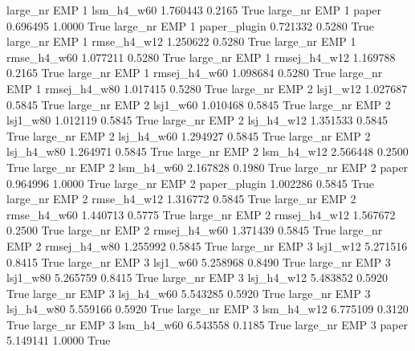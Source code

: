   large_nr      EMP                 1   lsm_h4_w60    1.760443      0.2165    True
  large_nr      EMP                 1        paper    0.696495      1.0000    True
  large_nr      EMP                 1 paper_plugin    0.721332      0.5280    True
  large_nr      EMP                 1  rmse_h4_w12    1.250622      0.5280    True
  large_nr      EMP                 1  rmse_h4_w60    1.077211      0.5280    True
  large_nr      EMP                 1 rmsej_h4_w12    1.169788      0.2165    True
  large_nr      EMP                 1 rmsej_h4_w60    1.098684      0.5280    True
  large_nr      EMP                 1 rmsej_h4_w80    1.017415      0.5280    True
  large_nr      EMP                 2     lsj1_w12    1.027687      0.5845    True
  large_nr      EMP                 2     lsj1_w60    1.010468      0.5845    True
  large_nr      EMP                 2     lsj1_w80    1.012119      0.5845    True
  large_nr      EMP                 2   lsj_h4_w12    1.351533      0.5845    True
  large_nr      EMP                 2   lsj_h4_w60    1.294927      0.5845    True
  large_nr      EMP                 2   lsj_h4_w80    1.264971      0.5845    True
  large_nr      EMP                 2   lsm_h4_w12    2.566448      0.2500    True
  large_nr      EMP                 2   lsm_h4_w60    2.167828      0.1980    True
  large_nr      EMP                 2        paper    0.964996      1.0000    True
  large_nr      EMP                 2 paper_plugin    1.002286      0.5845    True
  large_nr      EMP                 2  rmse_h4_w12    1.316772      0.5845    True
  large_nr      EMP                 2  rmse_h4_w60    1.440713      0.5775    True
  large_nr      EMP                 2 rmsej_h4_w12    1.567672      0.2500    True
  large_nr      EMP                 2 rmsej_h4_w60    1.371439      0.5845    True
  large_nr      EMP                 2 rmsej_h4_w80    1.255992      0.5845    True
  large_nr      EMP                 3     lsj1_w12    5.271516      0.8415    True
  large_nr      EMP                 3     lsj1_w60    5.258968      0.8490    True
  large_nr      EMP                 3     lsj1_w80    5.265759      0.8415    True
  large_nr      EMP                 3   lsj_h4_w12    5.483852      0.5920    True
  large_nr      EMP                 3   lsj_h4_w60    5.543285      0.5920    True
  large_nr      EMP                 3   lsj_h4_w80    5.559166      0.5920    True
  large_nr      EMP                 3   lsm_h4_w12    6.775109      0.3120    True
  large_nr      EMP                 3   lsm_h4_w60    6.543558      0.1185    True
  large_nr      EMP                 3        paper    5.149141      1.0000    True
